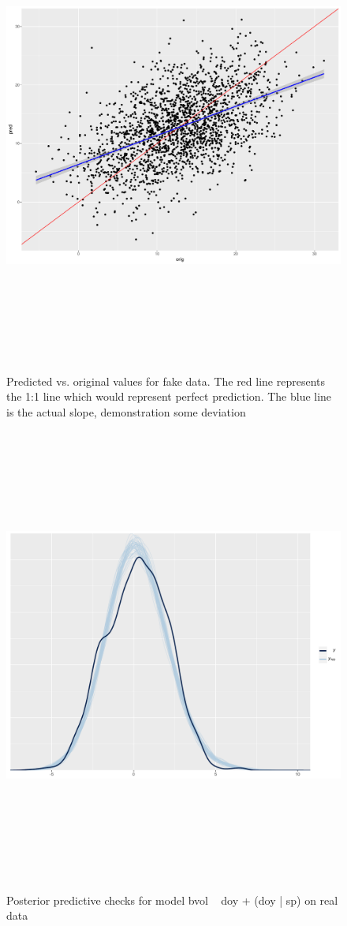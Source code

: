 \documentclass{article}\usepackage[]{graphicx}\usepackage[]{color}
\begin{document}
\begin{figure}[h!]
\includegraphics[width=15cm, height=15cm]{fake_predvsorig_final.pdf}\\
\caption{Predicted vs. original values for fake data. The red line represents the 1:1 line which would represent perfect prediction. The blue line is the actual slope, demonstration some deviation}
\end{figure}

\begin{figure}[h!]
\includegraphics[width=15cm, height=15cm]{pp_check_log_real.pdf}\\
\caption{Posterior predictive checks for model bvol ~ doy + (doy | sp) on real data}
\end{figure}
\end{document}
